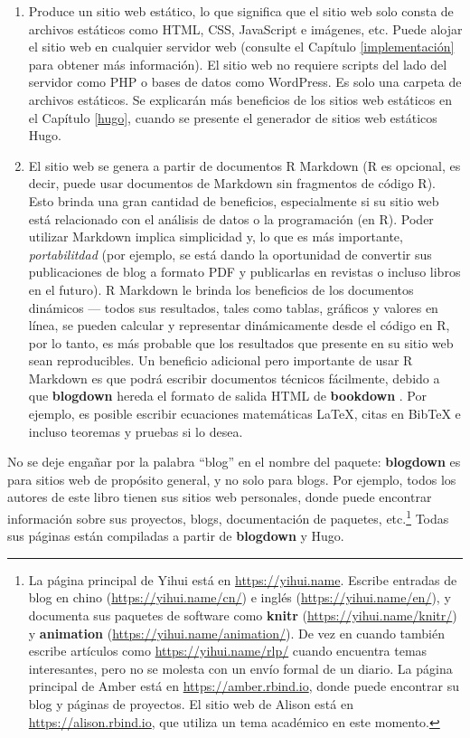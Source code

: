 \documentclass[12pt,]{krantz}
\theoremstyle{definition}
\theoremstyle{definition}
\theoremstyle{definition}
\theoremstyle{remark}
\begin{document}
\begin{enumerate}
\def\labelenumi{\arabic{enumi}.}
\item
  Produce un sitio web estático, lo que significa que el sitio web solo
  consta de archivos estáticos como HTML, CSS, JavaScript e imágenes,
  etc. Puede alojar el sitio web en cualquier servidor web (consulte el
  Capítulo \ref{implementación} para obtener más información). El sitio
  web no requiere scripts del lado del servidor como PHP o bases de
  datos como WordPress. Es solo una carpeta de archivos estáticos. Se
  explicarán más beneficios de los sitios web estáticos en el Capítulo
  \ref{hugo}, cuando se presente el generador de sitios web estáticos
  Hugo.
\item
  El sitio web se genera a partir de documentos R Markdown (R es
  opcional, es decir, puede usar documentos de Markdown sin fragmentos
  de código R). Esto brinda una gran cantidad de beneficios,
  especialmente si su sitio web está relacionado con el análisis de
  datos o la programación (en R). Poder utilizar Markdown implica
  simplicidad y, lo que es más importante, \emph{portabilitdad} (por
  ejemplo, se está dando la oportunidad de convertir sus publicaciones
  de blog a formato PDF y publicarlas en revistas o incluso libros en el
  futuro). R Markdown le brinda los beneficios de los documentos
  dinámicos --- todos sus resultados, tales como tablas, gráficos y
  valores en línea, se pueden calcular y representar dinámicamente desde
  el código en R, por lo tanto, es más probable que los resultados que
  presente en su sitio web sean reproducibles. Un beneficio adicional
  pero importante de usar R Markdown es que podrá escribir documentos
  técnicos fácilmente, debido a que \textbf{blogdown} hereda el formato
  de salida HTML de \textbf{bookdown} \citep{xie2016}. Por ejemplo, es
  posible escribir ecuaciones matemáticas LaTeX, citas en BibTeX e
  incluso teoremas y pruebas si lo desea.
\end{enumerate}

No se deje engañar por la palabra ``blog'' en el nombre del paquete:
\textbf{blogdown} es para sitios web de propósito general, y no solo
para blogs. Por ejemplo, todos los autores de este libro tienen sus
sitios web personales, donde puede encontrar información sobre sus
proyectos, blogs, documentación de paquetes, etc.\footnote{La página
  principal de Yihui está en \url{https://yihui.name}. Escribe entradas
  de blog en chino (\url{https://yihui.name/cn/}) e inglés
  (\url{https://yihui.name/en/}), y documenta sus paquetes de software
  como \textbf{knitr} (\url{https://yihui.name/knitr/}) y
  \textbf{animation} (\url{https://yihui.name/animation/}). De vez en
  cuando también escribe artículos como \url{https://yihui.name/rlp/}
  cuando encuentra temas interesantes, pero no se molesta con un envío
  formal de un diario. La página principal de Amber está en
  \url{https://amber.rbind.io}, donde puede encontrar su blog y páginas
  de proyectos. El sitio web de Alison está en
  \url{https://alison.rbind.io}, que utiliza un tema académico en este
  momento.} Todas sus páginas están compiladas a partir de
\textbf{blogdown} y Hugo.
\end{document}
